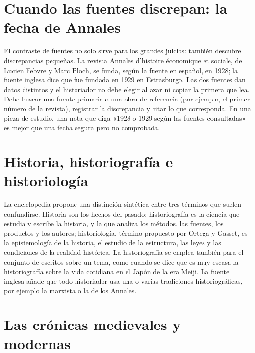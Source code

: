 \documentclass{book}
\begin{document}
\section{Cuando las fuentes discrepan: la fecha de Annales}

El contraste de fuentes no solo sirve para los grandes juicios: también descubre discrepancias pequeñas. La revista Annales d'histoire économique et sociale, de Lucien Febvre y Marc Bloch, se funda, según la fuente en español, en 1928; la fuente inglesa dice que fue fundada en 1929 en Estrasburgo. Las dos fuentes dan datos distintos y el historiador no debe elegir al azar ni copiar la primera que lea. Debe buscar una fuente primaria o una obra de referencia (por ejemplo, el primer número de la revista), registrar la discrepancia y citar lo que corresponda. En una pieza de estudio, una nota que diga «1928 o 1929 según las fuentes consultadas» es mejor que una fecha segura pero no comprobada.


\section{Historia, historiografía e historiología}

La enciclopedia propone una distinción sintética entre tres términos que suelen confundirse. Historia son los hechos del pasado; historiografía es la ciencia que estudia y escribe la historia, y la que analiza los métodos, las fuentes, los productos y los autores; historiología, término propuesto por Ortega y Gasset, es la epistemología de la historia, el estudio de la estructura, las leyes y las condiciones de la realidad histórica. La historiografía se emplea también para el conjunto de escritos sobre un tema, como cuando se dice que es muy escasa la historiografía sobre la vida cotidiana en el Japón de la era Meiji. La fuente inglesa añade que todo historiador usa una o varias tradiciones historiográficas, por ejemplo la marxista o la de los Annales.


\section{Las crónicas medievales y modernas}
\end{document}
